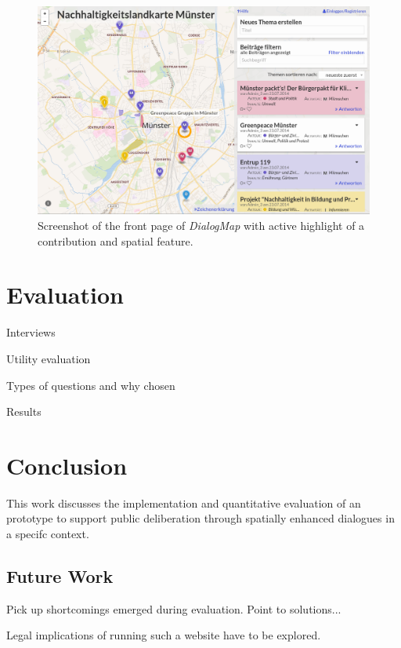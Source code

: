 \documentclass{sigchi}
\begin{document}
\begin{figure}[!h]
    \centering
    \includegraphics[width=0.9\columnwidth]{images/screenshot}
    \caption{Screenshot of the front page of \textit{DialogMap} with active highlight of a contribution and spatial feature.}
    \label{fig:screenshot}
\end{figure}


\section{Evaluation}

Interviews

Utility evaluation

Types of questions and why chosen

Results

\section{Conclusion}

This work discusses the implementation and quantitative evaluation of an prototype to support public deliberation through spatially enhanced dialogues in a specifc context.

\subsection{Future Work}
Pick up shortcomings emerged during evaluation. Point to solutions...

Legal implications of running such a website have to be explored.

\end{document}
